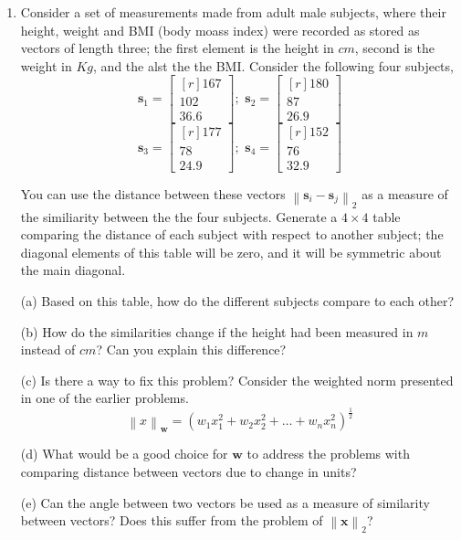 \begin{enumerate}
    \item Consider a set of measurements made from adult male subjects, where their height, weight and BMI (body moass index) were recorded as stored as vectors of length three; the first element is the height in $cm$, second is the weight in $Kg$, and the alst the the BMI. Consider the following four subjects,
    \[ \mathbf{s}_1 =  \begin{bmatrix*}[r]167\\102\\36.6\end{bmatrix*}; \,\,
    \mathbf{s}_2 =  \begin{bmatrix*}[r]180\\87\\26.9\end{bmatrix*} \]
    \[ \mathbf{s}_3 =  \begin{bmatrix*}[r]177\\78\\24.9\end{bmatrix*}; \,\,
    \mathbf{s}_4 =  \begin{bmatrix*}[r]152\\76\\32.9\end{bmatrix*} \]

    You can use the distance between these vectors $\left\lVert \mathbf{s}_i - \mathbf{s}_j\right\rVert_2$ as a measure of the similiarity between the the four subjects. Generate a $4 \times 4$ table comparing the distance of each subject with respect to another subject; the diagonal elements of this table will be zero, and it will be symmetric about the main diagonal. 

    (a) Based on this table, how do the different subjects compare to each other?

    (b) How do the similarities change if the height had been measured in $m$ instead of $cm$? Can you explain this difference?

    (c) Is there a way to fix this problem? Consider the weighted norm presented in one of the earlier problems.
    \[ \left\lVert x \right\rVert_\mathbf{w} = \left(w_1x_1^2 + w_2x_2^2 + \ldots + w_nx_n^2\right)^{\frac{1}{2}} \]

    (d) What would be a good choice for $\mathbf{w}$ to address the problems with comparing distance between vectors due to change in units?

    (e) Can the angle between two vectors be used as a measure of similarity between vectors? Does this suffer from the problem of $\left\lVert \mathbf{x} \right\rVert_2$?
\end{enumerate}
